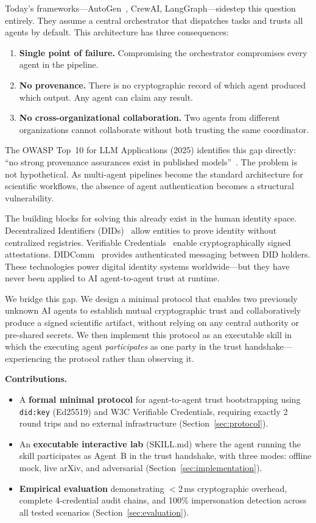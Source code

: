 \documentclass[11pt]{article}
\newcommand{\didkey}{\texttt{did:key}}
\newcommand{\vcs}{Verifiable Credentials}
\newcommand{\sref}[1]{Section~\ref{#1}}
\begin{document}
Today's frameworks---AutoGen~\cite{wu2023autogen}, CrewAI, LangGraph---sidestep this question entirely. They assume a central orchestrator that dispatches tasks and trusts all agents by default. This architecture has three consequences:

\begin{enumerate}[nosep,leftmargin=1.5em]
  \item \textbf{Single point of failure.} Compromising the orchestrator compromises every agent in the pipeline.
  \item \textbf{No provenance.} There is no cryptographic record of which agent produced which output. Any agent can claim any result.
  \item \textbf{No cross-organizational collaboration.} Two agents from different organizations cannot collaborate without both trusting the same coordinator.
\end{enumerate}

The OWASP Top~10 for LLM Applications (2025) identifies this gap directly: ``no strong provenance assurances exist in published models''~\cite{owasp2025}. The problem is not hypothetical. As multi-agent pipelines become the standard architecture for scientific workflows, the absence of agent authentication becomes a structural vulnerability.

The building blocks for solving this already exist in the human identity space. Decentralized Identifiers (DIDs)~\cite{w3cdid} allow entities to prove identity without centralized registries. \vcs{}~\cite{w3cvc} enable cryptographically signed attestations. DIDComm~\cite{didcomm} provides authenticated messaging between DID holders. These technologies power digital identity systems worldwide---but they have never been applied to AI agent-to-agent trust at runtime.

We bridge this gap. We design a minimal protocol that enables two previously unknown AI agents to establish mutual cryptographic trust and collaboratively produce a signed scientific artifact, without relying on any central authority or pre-shared secrets. We then implement this protocol as an executable skill in which the executing agent \emph{participates} as one party in the trust handshake---experiencing the protocol rather than observing it.

\medskip
\noindent\textbf{Contributions.}
\begin{itemize}[nosep,leftmargin=1.5em]
  \item A \textbf{formal minimal protocol} for agent-to-agent trust bootstrapping using \didkey{} (Ed25519) and W3C \vcs{}, requiring exactly 2 round trips and no external infrastructure (\sref{sec:protocol}).
  \item An \textbf{executable interactive lab} (SKILL.md) where the agent running the skill participates as Agent~B in the trust handshake, with three modes: offline mock, live arXiv, and adversarial (\sref{sec:implementation}).
  \item \textbf{Empirical evaluation} demonstrating $<$2\,ms cryptographic overhead, complete 4-credential audit chains, and 100\% impersonation detection across all tested scenarios (\sref{sec:evaluation}).
\end{itemize}
\end{document}
